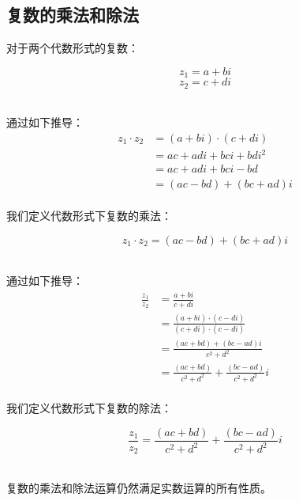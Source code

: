 \documentclass[UTF8]{ctexart}
\begin{document}
\subsection{复数的乘法和除法}
    对于两个代数形式的复数：
    \begin{large}
        \begin{equation*}
            z_1=a+bi
        \end{equation*}
        \begin{equation*}
            z_2=c+di
        \end{equation*}
    \end{large}\\
    通过如下推导：
    \setcounter{equation}{0}
    \begin{align}
        z_1\cdot z_2
        &=(a+bi)\cdot(c+di)\\[3mm]
        &=ac+adi+bci+bdi^2\\[3mm]
        &=ac+adi+bci-bd\\[3mm]
        &=(ac-bd)+(bc+ad)i
    \end{align}\\
    我们定义代数形式下复数的乘法：
    \begin{large}
        \begin{equation*}
            z_1\cdot z_2=(ac-bd)+(bc+ad)i
        \end{equation*}
    \end{large}\\
    通过如下推导：
    \setcounter{equation}{0}
    \begin{align}
        \frac{z_1}{z_2}
        &=\frac{a+bi}{c+di}\\[5mm]
        &=\frac{(a+bi)\cdot(c-di)}{(c+di)\cdot(c-di)}\\[5mm]
        &=\frac{(ac+bd)+(bc-ad)i}{c^2+d^2}\\[5mm]
        &=\frac{(ac+bd)}{c^2+d^2}+\frac{(bc-ad)}{c^2+d^2}i
    \end{align}\\
    我们定义代数形式下复数的除法：
    \begin{large}
        \begin{equation*}
            \frac{z_1}{z_2}=\frac{(ac+bd)}{c^2+d^2}+\frac{(bc-ad)}{c^2+d^2}i
        \end{equation*}
    \end{large}\\[1mm]
    复数的乘法和除法运算仍然满足实数运算的所有性质。

\newpage
\end{document}
